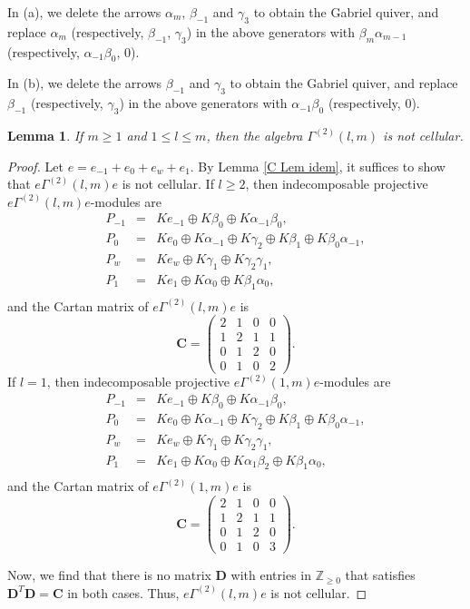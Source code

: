 \documentclass[12pt]{amsart}
\newtheorem{lem}[thm]{Lemma}
\numberwithin{equation}{thm}
\newcommand\ZZ{\mathbb Z}
\newcommand\bC{\mathbf C}
\newcommand\bD{\mathbf D}
\begin{document}
In (a), we delete the arrows $\alpha_{m}$, $\beta_{-1}$ and $\gamma_{3}$ to obtain the Gabriel quiver, and 
replace $\alpha_{m}$ (respectively, $\beta_{-1}$, $\gamma_{3}$) in the above generators 
with $\beta_{m}\alpha_{m-1}$ (respectively, $\alpha_{-1}\beta_{0}$, $0$). 

In (b), we delete the arrows $\beta_{-1}$ and $\gamma_{3}$ to obtain the Gabriel quiver, and 
replace $\beta_{-1}$ (respectively, $\gamma_{3}$) in the above generators 
with $\alpha_{-1}\beta_{0}$ (respectively, $0$).


\begin{lem}
\label{D V-1}
If $m\ge 1$ and $1\leq l\leq m$, then the algebra $\Gamma^{(2)}(l,m)$ is not cellular.
\end{lem}
\begin{proof}
Let $e=e_{-1}+e_0+e_w+e_1$. By Lemma \ref{C Lem idem}, 
it suffices to show that $e\Gamma^{(2)}(l,m)e$ is not cellular.
If $l\geq 2$, then indecomposable projective $e\Gamma^{(2)}(l,m)e$-modules are
\[\begin{array}{lcl}
P_{-1} &=& Ke_{-1}\oplus K \beta_{0}\oplus K\alpha_{-1}\beta_{0}, \\
P_{0} &=& Ke_0\oplus K\alpha_{-1}\oplus K\gamma_{2} \oplus K\beta_{1}\oplus K\beta_{0}\alpha_{-1}, \\
P_{w} &=& Ke_{w} \oplus K\gamma_{1}\oplus K\gamma_2\gamma_1, \\
P_{1} &=& Ke_{1} \oplus  K\alpha_{0}\oplus K\beta_{1}\alpha_{0}, \\
\end{array} \]
and the Cartan matrix of $e\Gamma^{(2)}(l,m)e$ is 
\[ \bC=\begin{pmatrix}
2 & 1 & 0 & 0 \\
1 & 2 & 1 & 1 \\
0 & 1 & 2 & 0 \\
0 & 1 & 0 & 2 \end{pmatrix}. \]
If $l=1$, then indecomposable projective $e\Gamma^{(2)}(1,m)e$-modules are
\[\begin{array}{lcl}
P_{-1} &=& Ke_{-1}\oplus K \beta_{0}\oplus K\alpha_{-1}\beta_{0}, \\
P_{0} &=& Ke_0\oplus K\alpha_{-1}\oplus K\gamma_{2} \oplus K\beta_{1}\oplus K\beta_{0}\alpha_{-1}, \\
P_{w} &=& Ke_{w} \oplus K\gamma_{1}\oplus K\gamma_2\gamma_1, \\
P_{1} &=& Ke_{1} \oplus  K\alpha_{0}\oplus K\alpha_{1}\beta_{2}\oplus K\beta_{1}\alpha_{0}, \\
\end{array} \]
and the Cartan matrix of $e\Gamma^{(2)}(1,m)e$ is 
\[ \bC=\begin{pmatrix}
2 & 1 & 0 & 0 \\
1 & 2 & 1 & 1 \\
0 & 1 & 2 & 0 \\
0 & 1 & 0 & 3 \end{pmatrix}. \]
 
Now, we find that there is no matrix $\bD$ with entries in $\ZZ_{\ge0}$ that satisfies 
$\bD^T\bD=\bC$ in both cases. 
Thus, $e\Gamma^{(2)}(l,m)e$ is not cellular. 
\end{proof}
\end{document}
